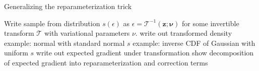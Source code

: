\documentclass{article}
\begin{document}




\par{Generalizing the reparameterization trick}

Write sample from distribution $s(\epsilon)$ as $\epsilon = \mathcal{T}^{-1}(\mathbf{z}; \mathbf{\nu})$ for some invertible transform $\mathcal{T}$ with variational parameters $\nu$.
write out transformed density
example: normal with standard normal $s$
example: inverse CDF of Gaussian with uniform $s$
write out expected gradient under transformation
show decomposition of expected gradient into reparameterization and correction terms 



\end{document}

